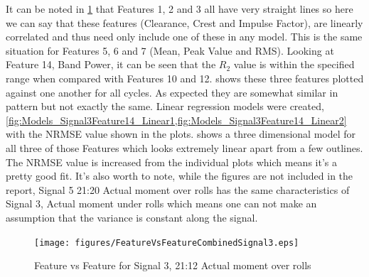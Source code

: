 \documentclass[]{article}
\begin{document}
It can be noted in \cref{fig:FeatureVsFeatureCombinedSignal3} that Features 1, 2 and 3 all have very straight lines so here we can say that these features (Clearance, Crest and Impulse Factor), are linearly correlated and thus need only include one of these in any model. This is the same situation for Features 5, 6 and 7 (Mean, Peak Value and RMS).
Looking at Feature 14, Band Power, it can be seen that the $R_2$ value is within the specified range when compared with Features 10 and 12.  shows these three features plotted against one another for all cycles. As expected they are somewhat similar in pattern but not exactly the same. Linear regression models were created, \cref{fig:Models_Signal3Feature14_Linear1,fig:Models_Signal3Feature14_Linear2} with the \gls{NRMSE} value shown in the plots.  shows a three dimensional model for all three of those Features which looks extremely linear apart from a few outlines. The \gls{NRMSE} value is increased from the individual plots which means it's a pretty good fit. It's also worth to note, while the figures are not included in the report, Signal 5 21:20 Actual moment over rolls has the same characteristics of Signal 3, Actual moment under rolls which means one can not make an assumption that the variance is constant along the signal.

\begin{figure}[H]
    \centering
    \texttt{[image: figures/FeatureVsFeatureCombinedSignal3.eps]}
    \caption{Feature vs Feature for Signal 3, 21:12 Actual moment over rolls}
    \label{fig:FeatureVsFeatureCombinedSignal3}
\end{figure}
\end{document}
